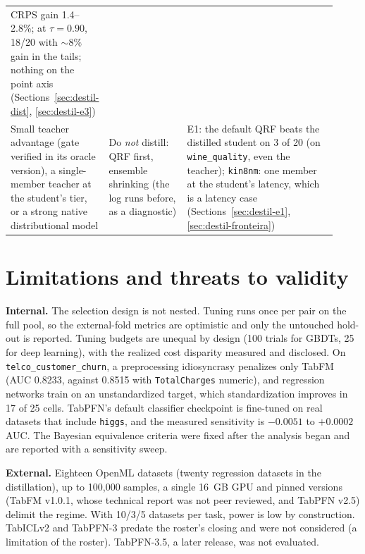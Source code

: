 \begin{table}[htb]
\begin{tabular}{>{\raggedright\arraybackslash}p{0.22\linewidth}>{\raggedright\arraybackslash}p{0.24\linewidth}>{\raggedright\arraybackslash}p{0.46\linewidth}}
CRPS gain 1.4--2.8\%; at $\tau{=}0.90$, 18/20 with ${\sim}8\%$ gain
in the tails; nothing on the point axis
(Sections~\ref{sec:destil-dist}, \ref{sec:destil-e3}) \\
\addlinespace[2pt]
Small teacher advantage (gate verified in its oracle version), a
single-member teacher at the student's tier, or a strong native distributional model &
Do \emph{not} distill: QRF first, ensemble shrinking (the log runs
before, as a diagnostic) &
E1: the default QRF beats the distilled student on 3 of 20 (on
\texttt{wine\_quality}, even the teacher); \texttt{kin8nm}: one
member at the student's latency, which is a latency case
(Sections~\ref{sec:destil-e1}, \ref{sec:destil-fronteira}) \\
\bottomrule
\end{tabular}
\end{table}

\section{Limitations and threats to validity}
\label{sec:conc-limitacoes}

\textbf{Internal.} The selection design is not nested. Tuning runs
once per pair on the full pool, so the external-fold metrics are
optimistic and only the untouched hold-out is reported. Tuning
budgets are unequal by design (100 trials for GBDTs, 25 for deep
learning), with the realized cost disparity measured and disclosed.
On \texttt{telco\_customer\_churn}, a preprocessing idiosyncrasy
penalizes only TabFM (AUC 0.8233, against 0.8515 with
\texttt{TotalCharges} numeric), and regression networks train on an
unstandardized target, which standardization improves in 17 of 25
cells. TabPFN's default classifier checkpoint is
fine-tuned on real datasets that include \texttt{higgs}, and the measured
sensitivity is $-0.0051$ to $+0.0002$ AUC. The Bayesian equivalence
criteria were fixed after the analysis began and are reported with
a sensitivity sweep.

\textbf{External.} Eighteen OpenML datasets (twenty regression
datasets in the distillation), up to 100{,}000 samples, a single
16~GB GPU and pinned versions (TabFM v1.0.1, whose technical report
was not peer reviewed, and TabPFN v2.5) delimit the regime. With 10/3/5 datasets per task, power is
low by construction. TabICLv2 and TabPFN-3 predate the roster's
closing and were not considered (a limitation of the roster). TabPFN-3.5, a later release, was not evaluated.

